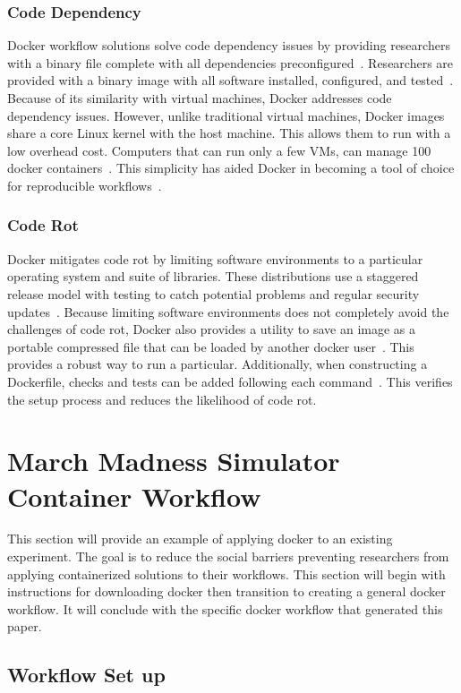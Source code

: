 \documentclass{IEEEtran}
\begin{document}
\subsubsection{Code Dependency}
Docker workflow solutions solve code dependency issues by providing researchers with a binary file complete with all dependencies preconfigured~\cite{ITD}. Researchers are provided with a binary image with all software installed, configured, and tested~\cite{ITD}. 
Because of its similarity with virtual machines, Docker addresses code dependency issues. However, unlike traditional virtual machines, Docker images share a core Linux kernel with the host machine. This allows them to run with a low overhead cost. Computers that can run only a few VMs, can manage 100 docker containers~\cite{ITD}. This simplicity has aided Docker in becoming a tool of choice for reproducible workflows~\cite{ITD}.

\subsubsection{Code Rot}
Docker mitigates code rot by limiting software environments to a particular operating system and suite of libraries. These distributions use a staggered release model with testing to catch potential problems and regular security updates~\cite{ITD}. Because limiting software environments does not completely avoid the challenges of code rot, Docker also provides a utility to save an image as a portable compressed file that can be loaded by another docker user~\cite{ITD}. This provides a robust way to run a particular. Additionally, when constructing a Dockerfile, checks and tests can be added following each command~\cite{ITD}. This verifies the setup process and reduces the likelihood of code rot.


\section{March Madness Simulator Container Workflow}
This section will provide an example of applying docker to an existing experiment. The goal is to reduce the social barriers preventing researchers from applying containerized solutions to their workflows. This section will begin with instructions for downloading docker then transition to creating a general docker workflow. It will conclude with the specific docker workflow that generated this paper.

\subsection{Workflow Set up}
\end{document}
